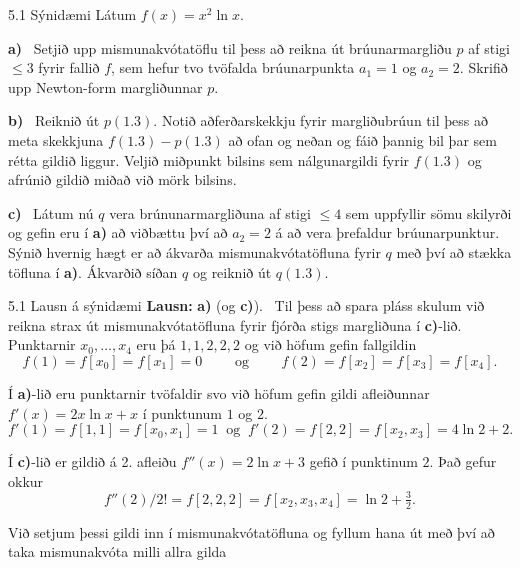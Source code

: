 \begin{frame}{5.1 Sýnidæmi} 
Látum $f(x)=x^2\ln x$.  

\smallskip
{\bf a)} \  Setjið upp mismunakvótatöflu til þess að 
reikna út brúunarmargliðu $p$ af stigi $\leq 3$  fyrir fallið $f$, 
sem hefur tvo tvöfalda brúunarpunkta $a_1=1$ og $a_2=2$.
Skrifið upp Newton-form margliðunnar $p$.

\pause
\smallskip
{\bf b)} \  Reiknið út  $p(1.3)$. Notið aðferðarskekkju
fyrir margliðubrúun til þess að meta skekkjuna
$f(1.3)-p(1.3)$ að ofan og neðan og fáið þannig bil
þar sem rétta gildið liggur.  Veljið miðpunkt bilsins
sem nálgunargildi fyrir $f(1.3)$ og afrúnið gildið miðað
við mörk bilsins.

\pause
\smallskip
{\bf c)} \ Látum nú $q$ vera brúnunarmargliðuna
af stigi $\leq 4$  sem uppfyllir sömu skilyrði og gefin eru í {\bf a)}
að viðbættu því að $a_2=2$ á að vera þrefaldur brúunarpunktur.
Sýnið hvernig hægt er að ákvarða  mismunakvótatöfluna fyrir $q$
með því  að stækka töfluna í {\bf a)}.  Ákvarðið síðan $q$ og 
reiknið út $q(1.3)$.
\end{frame}

\begin{frame}{5.1  Lausn á sýnidæmi} 
{\bf Lausn:}  {\bf a)} (og {\bf c)}).  \ Til þess að spara pláss 
skulum við reikna strax út
mismunakvótatöfluna fyrir fjórða stigs margliðuna í {\bf c)}-lið.
Punktarnir $x_0,\dots,x_4$ eru þá $1,1,2,2,2$ og við höfum gefin
fallgildin 
$$f(1)=f[x_0]=f[x_1]=0 \qquad  \text{ og } \qquad
f(2)=f[x_2]=f[x_3]=f[x_4].
$$

\pause
\smallskip
Í {\bf a)}-lið eru punktarnir tvöfaldir svo við höfum gefin 
gildi afleiðunnar  $f'(x)=2x\ln x+x$ í punktunum $1$ og $2$.
$$
f'(1)=f[1,1]=f[x_0,x_1]=1 \ \text{ og } \  
f'(2)=f[2,2]=f[x_2,x_3]=4\ln 2+2.
$$

\pause
\smallskip
Í {\bf c)}-lið er gildið á 2. afleiðu $f''(x)=2\ln x +3$ gefið
í punktinum $2$.  Það gefur okkur
$$f''(2)/2!=f[2,2,2]=f[x_2,x_3,x_4]=\ln 2+\tfrac 32.
$$   

\pause
Við setjum þessi gildi inn í mismunakvótatöfluna og 
fyllum hana út með því að taka mismunakvóta milli allra gilda 
\end{frame}

